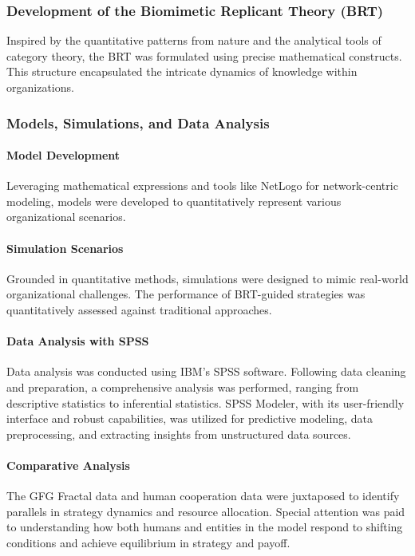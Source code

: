 \documentclass[sn-nature]{sn-jnl}%
\theoremstyle{thmstyleone}%
\theoremstyle{thmstyletwo}%
\theoremstyle{thmstylethree}%
\begin{document}
\subsubsection{Development of the Biomimetic Replicant Theory (BRT)}

Inspired by the quantitative patterns from nature and the analytical tools of category theory, the BRT was formulated using precise mathematical constructs. This structure encapsulated the intricate dynamics of knowledge within organizations.


\subsubsection{Models, Simulations, and Data Analysis}

\paragraph{Model Development} Leveraging mathematical expressions and tools like NetLogo for network-centric modeling, models were developed to quantitatively represent various organizational scenarios.

\paragraph{Simulation Scenarios} Grounded in quantitative methods, simulations were designed to mimic real-world organizational challenges. The performance of BRT-guided strategies was quantitatively assessed against traditional approaches.

\paragraph{Data Analysis with SPSS} Data analysis was conducted using IBM’s SPSS software. Following data cleaning and preparation, a comprehensive analysis was performed, ranging from descriptive statistics to inferential statistics. SPSS Modeler, with its user-friendly interface and robust capabilities, was utilized for predictive modeling, data preprocessing, and extracting insights from unstructured data sources.

\paragraph{Comparative Analysis}
The GFG Fractal data and human cooperation data were juxtaposed to identify parallels in strategy dynamics and resource allocation. Special attention was paid to understanding how both humans and entities in the model respond to shifting conditions and achieve equilibrium in strategy and payoff.
\end{document}
